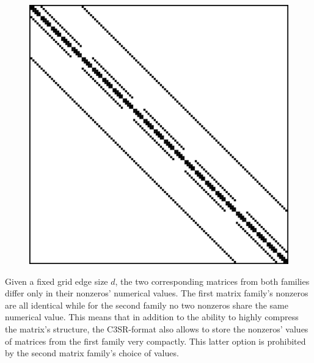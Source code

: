     \begin{figure}[H]
        \centering
        \captionsetup{width=0.9\columnwidth}
        \begin{minipage}{0.45\textwidth}
          \centering
          
        \end{minipage}\hfill
        \begin{minipage}{0.45\textwidth}
          \centering
          \includegraphics[width=1.0\textwidth]{fig/laplacian_example.png} %
        \end{minipage}
        \label{fig:laplacian-example-reprint}
    \end{figure}

    Given a fixed grid edge size $d$, the two corresponding matrices from both families differ only in their nonzeros'
    numerical values. The first matrix family's nonzeros are all identical while for the second family no two nonzeros
    share the same numerical value. This means that in addition to the ability to highly compress the matrix's
    structure, the C3SR-format also allows to store the nonzeros' values of matrices from the first family very
    compactly. This latter option is prohibited by the second matrix family's choice of values.

